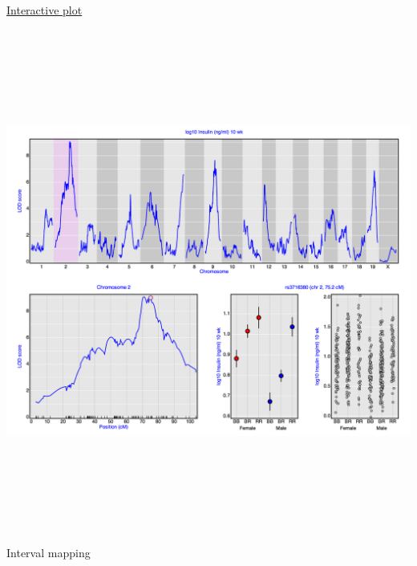 \documentclass[12pt]{article}
\newcommand{\headsize}{\fontsize{35}{35} \selectfont}
\begin{document}
\newpage

\headsize \color{myyellow}
\hfill \begin{minipage}{5.75in}
\centering
\href{http://www.biostat.wisc.edu/~kbroman/D3/lod_and_effect/}{Interactive plot}
\end{minipage}

\vfill

\centerline{\href{http://www.biostat.wisc.edu/~kbroman/D3/lod_and_effect/}{\includegraphics[height=6.5in]{FigsA/interactive_lod_curve.png}}}

\vspace*{1cm}






\newpage

\headsize \color{myyellow}
\hfill \begin{minipage}{5.75in}
\centering
Interval mapping
\end{minipage}

\vspace{2cm}
\end{document}
